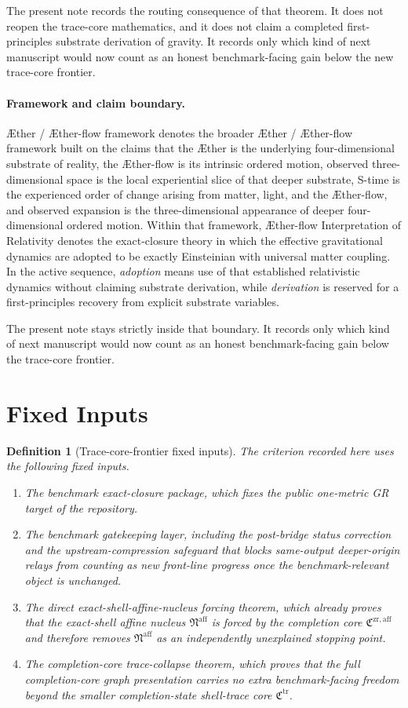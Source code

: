 \documentclass[11pt]{article}
\newcommand{\Aether}{\AE{}ther}
\newcommand{\Aflow}{\AE{}ther-flow}
\newcommand{\TheoryName}{\Aflow{} Interpretation of Relativity}
\newcommand{\TheoryProgram}{\Aether{} / \Aflow{} framework}
\newcommand{\CompletionCore}{\mathfrak C^{\mathrm{zr,aff}}}
\newcommand{\TraceCore}{\mathfrak C^{\mathrm{tr}}}
\newcommand{\AffineNucleus}{\mathfrak N^{\mathrm{aff}}}
\newtheorem{definition}{Definition}
\begin{document}
The present note records the routing consequence of that theorem. It does not reopen the trace-core mathematics, and it does not claim a completed first-principles substrate derivation of gravity. It records only which kind of next manuscript would now count as an honest benchmark-facing gain below the new trace-core frontier.

\paragraph{Framework and claim boundary.}
\TheoryProgram{} denotes the broader \Aether{} / \Aflow{} framework built on the claims that the \Aether{} is the underlying four-dimensional substrate of reality, the \Aflow{} is its intrinsic ordered motion, observed three-dimensional space is the local experiential slice of that deeper substrate, S-time is the experienced order of change arising from matter, light, and the \Aflow{}, and observed expansion is the three-dimensional appearance of deeper four-dimensional ordered motion. Within that framework, \TheoryName{} denotes the exact-closure theory in which the effective gravitational dynamics are adopted to be exactly Einsteinian with universal matter coupling. In the active sequence, \emph{adoption} means use of that established relativistic dynamics without claiming substrate derivation, while \emph{derivation} is reserved for a first-principles recovery from explicit substrate variables.

The present note stays strictly inside that boundary. It records only which kind of next manuscript would now count as an honest benchmark-facing gain below the trace-core frontier.

\section{Fixed Inputs}

\begin{definition}[Trace-core-frontier fixed inputs]
The criterion recorded here uses the following fixed inputs.
\begin{enumerate}
    \item The benchmark exact-closure package, which fixes the public one-metric GR target of the repository.
    \item The benchmark gatekeeping layer, including the post-bridge status correction and the upstream-compression safeguard that blocks same-output deeper-origin relays from counting as new front-line progress once the benchmark-relevant object is unchanged.
    \item The direct exact-shell-affine-nucleus forcing theorem, which already proves that the exact-shell affine nucleus \(\AffineNucleus\) is forced by the completion core \(\CompletionCore\) and therefore removes \(\AffineNucleus\) as an independently unexplained stopping point.
    \item The completion-core trace-collapse theorem, which proves that the full completion-core graph presentation carries no extra benchmark-facing freedom beyond the smaller completion-state shell-trace core \(\TraceCore\).
\end{enumerate}
\end{definition}
\end{document}
